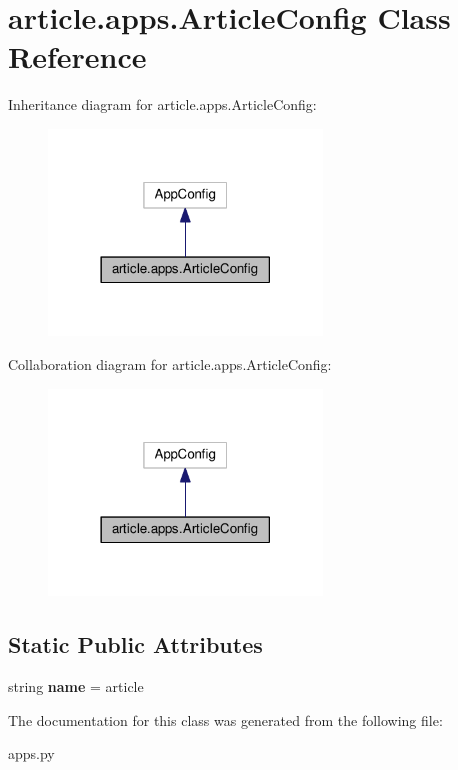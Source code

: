 \hypertarget{classarticle_1_1apps_1_1ArticleConfig}{}\section{article.\+apps.\+Article\+Config Class Reference}
\label{classarticle_1_1apps_1_1ArticleConfig}


Inheritance diagram for article.\+apps.\+Article\+Config\+:
\nopagebreak
\begin{figure}[H]
\begin{center}
\leavevmode
\includegraphics[width=206pt]{classarticle_1_1apps_1_1ArticleConfig__inherit__graph}
\end{center}
\end{figure}


Collaboration diagram for article.\+apps.\+Article\+Config\+:
\nopagebreak
\begin{figure}[H]
\begin{center}
\leavevmode
\includegraphics[width=206pt]{classarticle_1_1apps_1_1ArticleConfig__coll__graph}
\end{center}
\end{figure}
\subsection*{Static Public Attributes}
\begin{DoxyCompactItemize}
\item 
\hypertarget{classarticle_1_1apps_1_1ArticleConfig_ade0b2cad93d9873fde99a9e3ed0e3190}{}string {\bfseries name} = \textquotesingle{}article\textquotesingle{}\label{classarticle_1_1apps_1_1ArticleConfig_ade0b2cad93d9873fde99a9e3ed0e3190}

\end{DoxyCompactItemize}


The documentation for this class was generated from the following file\+:\begin{DoxyCompactItemize}
\item 
apps.\+py\end{DoxyCompactItemize}
